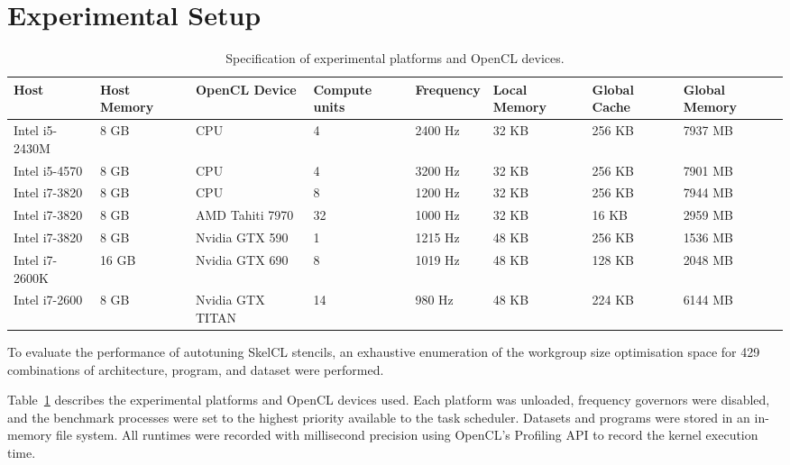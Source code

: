 \documentclass[nonatbib,preprint,10pt]{sigplanconf}
\begin{document}
\section{Experimental Setup}

\begin{table}
\scriptsize
\centering
\begin{tabular}{l l l l l l l l}
\toprule
Host & Host Memory &  OpenCL Device &  Compute units & Frequency & Local Memory & Global Cache & Global Memory \\
\midrule
Intel i5-2430M & 8 GB  & CPU              &              4 &   2400 Hz &        32 KB &       256 KB &       7937 MB \\
Intel i5-4570  & 8 GB  & CPU              &              4 &   3200 Hz &        32 KB &       256 KB &       7901 MB \\
Intel i7-3820  & 8 GB  & CPU              &              8 &   1200 Hz &        32 KB &       256 KB &       7944 MB \\
Intel i7-3820  & 8 GB  & AMD Tahiti 7970  &             32 &   1000 Hz &        32 KB &        16 KB &       2959 MB \\
Intel i7-3820  & 8 GB  & Nvidia GTX 590   &              1 &   1215 Hz &        48 KB &       256 KB &       1536 MB \\
Intel i7-2600K & 16 GB & Nvidia GTX 690   &              8 &   1019 Hz &        48 KB &       128 KB &       2048 MB \\
Intel i7-2600  & 8 GB  & Nvidia GTX TITAN &             14 &    980 Hz &        48 KB &       224 KB &       6144 MB \\
\bottomrule
\end{tabular}
\caption{Specification of experimental platforms and OpenCL devices.}
\label{tab:hw}
\end{table}

To evaluate the performance of autotuning SkelCL stencils, an
exhaustive enumeration of the workgroup size optimisation space for
429 combinations of architecture, program, and dataset were
performed.


Table~\ref{tab:hw} describes the experimental platforms and OpenCL
devices used. Each platform was unloaded, frequency governors were
disabled, and the benchmark processes were set to the highest priority
available to the task scheduler. Datasets and programs were stored in
an in-memory file system. All runtimes were recorded with millisecond
precision using OpenCL's Profiling API to record the kernel execution
time.
\end{document}
